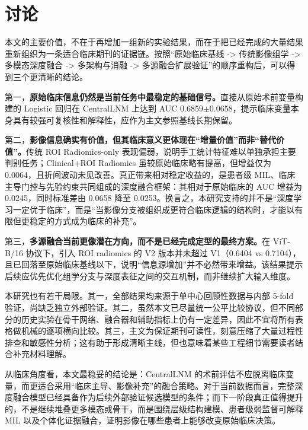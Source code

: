 \section{讨论}

本文的主要价值，不在于再增加一组新的实验结果，而在于把已经完成的大量结果重新组织为一条适合临床期刊的证据链。按照“原始临床基线 -> 传统影像组学 -> 多模态深度融合 -> 多架构与消融 -> 多源融合扩展验证”的顺序重构后，可以得到三个更清晰的结论。

第一，\textbf{原始临床信息仍然是当前任务中最稳定的基础信号。}直接从原始术前变量构建的 Logistic 回归在 CentralLNM 上达到 AUC 0.6859$\pm$0.0658，提示临床变量本身具有较强可复核性和解释性，应作为主文参照基线长期保留。

第二，\textbf{影像信息确实有价值，但其临床意义更体现在“增量价值”而非“替代价值”。}传统 ROI Radiomics-only 表现偏弱，说明手工统计特征难以单独承担主要判别任务；Clinical+ROI Radiomics 虽较原始临床略有提高，但增益仅为 0.0064，且折间波动未见改善。真正带来相对稳定收益的，是患者级 MIL、临床主导门控与先验约束共同组成的深度融合框架：其相对于原始临床的 AUC 增益为 0.0245，同时标准差由 0.0658 降至 0.0253。换言之，本研究支持的并不是“深度学习一定优于临床”，而是“当影像分支被组织成更符合临床逻辑的结构时，才能以有限但更稳定的方式成为临床的补充”。

第三，\textbf{多源融合当前更像潜在方向，而不是已经完成定型的最终方案。}在 ViT-B/16 协议下，引入 ROI radiomics 的 V2 版本并未超过 V1（0.6404 vs 0.7104），且已回落至原始临床基线以下，说明“信息源增加”并不必然带来增益。该结果提示后续应优先优化组学分支与深度表征之间的交互机制，而非继续扩大输入维度。

本研究也有若干局限。其一，全部结果均来源于单中心回顾性数据与内部 5-fold 验证，尚缺乏独立外部验证。其二，虽然本文已尽量统一公平比较协议，但不同部分的历史实验在骨干网络、融合器和辅助指标上仍有一定差异，因此不宜将所有表格做机械的逐项横向比较。其三，主文为保证期刊可读性，刻意压缩了大量过程性排查和敏感性分析；这有助于形成清晰主线，但也意味着某些工程细节需要读者结合补充材料理解。

从临床角度看，本文最稳妥的结论是：CentralLNM 的术前评估不应脱离临床变量，而更适合采用“临床主导、影像补充”的融合策略。对于当前数据而言，完整深度融合模型已经具备作为后续外部验证候选模型的条件；而下一阶段真正值得提升的，不是继续堆叠更多模态或骨干，而是围绕层级结构建模、患者级弱监督可解释 MIL 以及个体化证据融合，证明影像在哪些患者上能够改变原始临床决策。
